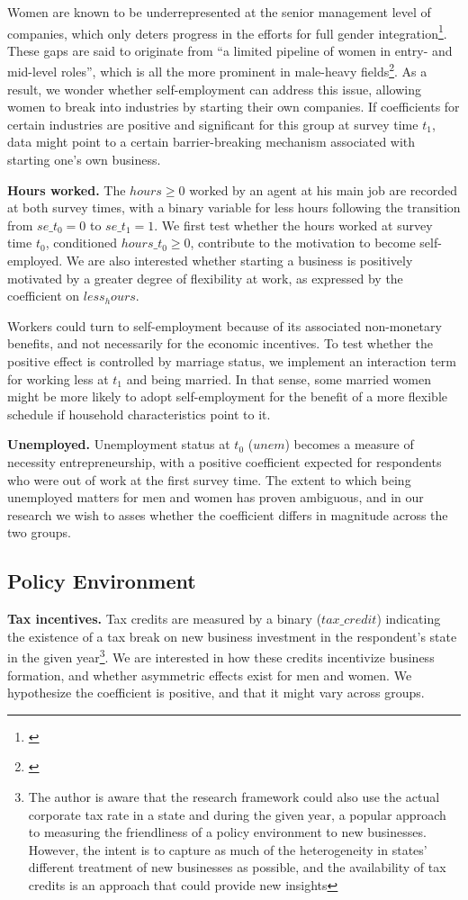 Women are known to be underrepresented at the senior management level of companies, which only deters progress in the efforts for full gender integration\footnote{\cite{olivetti2016dp11034}}. These gaps are said to originate from ``a limited pipeline of women in entry- and mid-level roles'', which is all the more prominent in male-heavy fields\footnote{\cite{adams2012beyond}}. As a result, we wonder whether self-employment can address this issue, allowing women to break into industries by starting their own companies. If coefficients for certain industries are positive and significant for this group at survey time $t_1$, data might point to a certain barrier-breaking mechanism associated with starting one's own business. 


\textbf{Hours worked.} The $hours \geq 0$ worked by an agent at his main job are recorded at both survey times, with a binary variable for less hours following the transition from $se\_t_0 = 0$ to $se\_t_1 = 1$. We first test whether the hours worked at survey time $t_0$, conditioned $hours\_t_0 \geq 0$, contribute to the motivation to become self-employed. We are also interested whether starting a business is positively motivated by a greater degree of flexibility at work, as expressed by the coefficient on $less_hours$. 

Workers could turn to self-employment because of its associated non-monetary benefits, and not necessarily for the economic incentives. To test whether the positive effect is controlled by marriage status, we implement an interaction term for working less at $t_1$ and being married. In that sense, some married women might be more likely to adopt self-employment for the benefit of a more flexible schedule if household characteristics point to it. 

\textbf{Unemployed.} Unemployment status at $t_0$ ($unem$) becomes a measure of necessity entrepreneurship, with a positive coefficient expected for respondents who were out of work at the first survey time. The extent to which being unemployed matters for men and women has proven ambiguous, and in our research we wish to asses whether the coefficient differs in magnitude across the two groups.


\subsection{Policy Environment}

\textbf{Tax incentives.} Tax credits are measured by a binary ($tax\_credit$) indicating the existence of a tax break on new business investment in the respondent's state in the given year\footnote{The author is aware that the research framework could also use the actual corporate tax rate in a state and during the given year, a popular approach to measuring the friendliness of a policy environment to new businesses. However, the intent is to capture as much of the heterogeneity in states' different treatment of new businesses as possible, and the availability of tax credits is an approach that could provide new insights}. We are interested in how these credits incentivize business formation, and whether asymmetric effects exist for men and women. We hypothesize the coefficient is positive, and that it might vary across groups.

